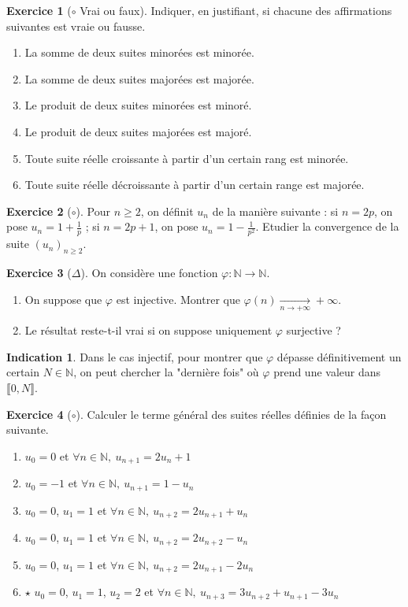 \documentclass[french]{book}
\newcommand{\N}{\mathbb{N}}
\theoremstyle{definition}
\newtheorem{ex}{Exercice}[chapter]
\theoremstyle{theorem}
\newtheorem*{ind}{Indication}
\theoremstyle{remark}
\begin{document}
\begin{ex}[$\circ$ Vrai ou faux]
	Indiquer, en justifiant, si chacune des affirmations suivantes est vraie ou fausse.
	\begin{enumerate}
		\item La somme de deux suites minorées est minorée.
		\item La somme de deux suites majorées est majorée.
		\item Le produit de deux suites minorées est minoré.
		\item Le produit de deux suites majorées est majoré.
		\item Toute suite réelle croissante à partir d'un certain rang est minorée.
		\item Toute suite réelle décroissante à partir d'un certain range est majorée.
	\end{enumerate}
\end{ex}

\begin{ex}[$\circ$]
	Pour $n\geqslant 2$, on définit $u_n$ de la manière suivante : si $n=2p$, on pose $u_n=\displaystyle1+\frac{1}{p}$ ; si $n=2p+1$, on pose $u_n=1-\displaystyle\frac{1}{p^2}$. Etudier la convergence de la suite $(u_n)_{n\geqslant 2}$.
\end{ex}

\begin{ex}[$\Delta$]
	On considère une fonction $\varphi:\N\to\N$.
	\begin{enumerate}
		\item On suppose que $\varphi$ est injective. Montrer que $\varphi(n)\xrightarrow[n\to+\infty]{}+\infty$.
		\item Le résultat reste-t-il vrai si on suppose uniquement $\varphi$ surjective ?
	\end{enumerate}
\end{ex}

\begin{ind}
	Dans le cas injectif, pour montrer que $\varphi$ dépasse définitivement un certain $N\in\N$, on peut chercher la "dernière fois" où $\varphi$ prend une valeur dans $\llbracket0,N\rrbracket$.
\end{ind}

\begin{ex}[$\circ$]
	Calculer le terme général des suites réelles définies de la façon suivante.
	\begin{enumerate}
		\item $u_0=0$ et $\forall n\in\N,\ u_{n+1}=2u_n+1$
		\item $u_0=-1$ et $\forall n\in\N,\ u_{n+1}=1-u_n$
		\item $u_0=0$, $u_1=1$ et $\forall n\in\N,\ u_{n+2}=2u_{n+1}+u_n$
		\item $u_0=0$, $u_1=1$ et $\forall n\in\N,\ u_{n+2}=2u_{n+2}-u_n$
		\item $u_0=0$, $u_1=1$ et $\forall n\in\N,\ u_{n+2}=2u_{n+1}-2u_n$
		\item $\star$ $u_0=0$, $u_1=1$, $u_2=2$ et $\forall n\in\N,\ u_{n+3}=3u_{n+2}+u_{n+1}-3u_n$
	\end{enumerate}
\end{ex}
\end{document}
